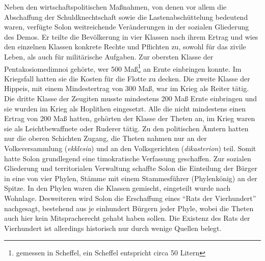 \documentclass{article}
\begin{document}
Neben den wirtschaftspolitischen Maßnahmen, von denen vor allem die Abschaffung der Schuldknechtschaft sowie die Lastenabschüttelung bedeutend waren, verfügte Solon weitreichende Veränderungen in der sozialen Gliederung des Demos. Er teilte die Bevölkerung in vier Klassen nach ihrem Ertrag und wies den einzelnen Klassen konkrete Rechte und Pflichten zu, sowohl für das zivile Leben, als auch für militärische Aufgaben. Zur obersten Klasse der Pentakosiomedimnoi gehörte, wer 500 Maß\footnote{gemessen in Scheffel, ein Scheffel entspricht circa 50 Litern} an Ernte einbringen konnte. Im Kriegsfall hatten sie die Kosten für die Flotte zu decken. Die zweite Klasse der Hippeis, mit einem Mindestertrag von 300 Maß, war im Krieg als Reiter tätig. Die dritte Klasse der Zeugiten musste mindestens 200 Maß Ernte einbringen und sie wurden im Krieg als Hoplithen eingesetzt. Alle die nicht mindestens einen Ertrag von 200 Maß hatten, gehörten der Klasse der Theten an, im Krieg waren sie als Leichtbewaffnete oder Ruderer tätig. Zu den politischen Ämtern hatten nur die oberen Schichten Zugang, die Theten nahmen nur an der Volksversammlung (\textit{ekklesia}) und an den Volksgerichten (\textit{dikasterion}) teil. Somit hatte Solon grundlegend eine timokratische Verfassung geschaffen. Zur sozialen Gliederung und territorialen Verwaltung schaffte Solon die Einteilung der Bürger in eine von vier Phylen, Stämme mit einem Stammesführer (Phylenkönig) an der Spitze. In den Phylen waren die Klassen gemischt, eingeteilt wurde nach Wohnlage. Desweiteren wird Solon die Erschaffung eines "`Rats der Vierhundert"' nachgesagt, bestehend aus je einhundert Bürgern jeder Phyle, wobei die Theten auch hier kein Mitspracherecht gehabt haben sollen. Die Existenz des Rats der Vierhundert ist allerdings historisch nur durch wenige Quellen belegt.  \\
\end{document}
